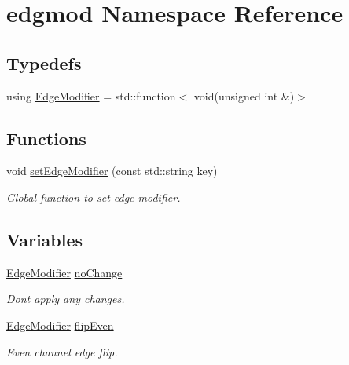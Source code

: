 \hypertarget{namespaceedgmod}{}\section{edgmod Namespace Reference}
\label{namespaceedgmod}
\subsection*{Typedefs}
\begin{DoxyCompactItemize}
\item 
using \hyperlink{namespaceedgmod_abd975beb42f73310619eb134f62d7712}{Edge\+Modifier} = std\+::function$<$ void(unsigned int \&)$>$
\end{DoxyCompactItemize}
\subsection*{Functions}
\begin{DoxyCompactItemize}
\item 
void \hyperlink{namespaceedgmod_abf9bf9a87d7a5e31d233545b0e8a3c36}{set\+Edge\+Modifier} (const std\+::string key)
\begin{DoxyCompactList}\small\item\em Global function to set edge modifier. \end{DoxyCompactList}\end{DoxyCompactItemize}
\subsection*{Variables}
\begin{DoxyCompactItemize}
\item 
\hyperlink{namespaceedgmod_abd975beb42f73310619eb134f62d7712}{Edge\+Modifier} \hyperlink{namespaceedgmod_a912724097db2099cc7793a83e42673d7}{no\+Change}
\begin{DoxyCompactList}\small\item\em Don\textquotesingle{}t apply any changes. \end{DoxyCompactList}\item 
\hyperlink{namespaceedgmod_abd975beb42f73310619eb134f62d7712}{Edge\+Modifier} \hyperlink{namespaceedgmod_af31c90c50e8178bf4618a65e5252faff}{flip\+Even}
\begin{DoxyCompactList}\small\item\em Even channel edge flip. \end{DoxyCompactList}\end{DoxyCompactItemize}



